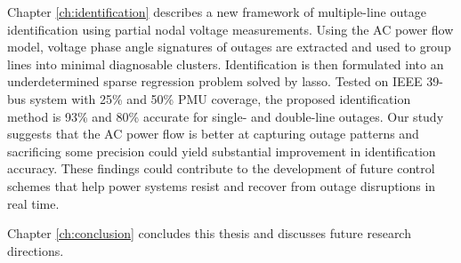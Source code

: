 Chapter \ref{ch:identification} describes a new framework of multiple-line outage identification using partial nodal voltage measurements. Using the AC power flow model, voltage phase angle signatures of outages are extracted and used to group lines into minimal diagnosable clusters. Identification is then formulated into an underdetermined sparse regression problem solved by lasso. Tested on IEEE 39-bus system with 25\% and 50\% PMU coverage, the proposed identification method is 93\% and 80\% accurate for single- and double-line outages. 
Our study suggests that the AC power flow is better at capturing outage patterns and sacrificing some precision could yield substantial improvement in identification accuracy. These findings could contribute to the development of future control schemes that help power systems resist and recover from outage disruptions in real time. 


Chapter \ref{ch:conclusion} concludes this thesis and discusses future research directions.
